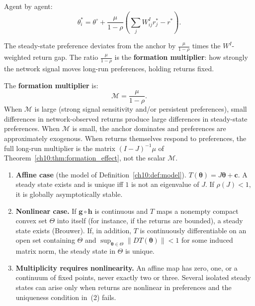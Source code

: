 \documentclass[../structural_economics_book.tex]{subfiles}
\begin{document}
Agent by agent:
\begin{equation}\label{ch10:eq:steady_i}
\theta_i^* = \theta^{\circ} + \frac{\mu}{1-\rho}\left(\sum_j W^I_{ij} r_j^* - r^*\right).
\end{equation}

The steady-state preference deviates from the anchor by $\frac{\mu}{1-\rho}$ times the $W^I$-weighted return gap. The ratio $\frac{\mu}{1-\rho}$ is the \textbf{formation multiplier}: how strongly the network signal moves long-run preferences, holding returns fixed.

\begin{definition}\label{ch10:def:multiplier}
The \textbf{formation multiplier} is:
\begin{equation}\label{ch10:eq:multiplier}
\mathcal{M} = \frac{\mu}{1-\rho}.
\end{equation}
When $\mathcal{M}$ is large (strong signal sensitivity and/or persistent preferences), small differences in network-observed returns produce large differences in steady-state preferences. When $\mathcal{M}$ is small, the anchor dominates and preferences are approximately exogenous. When returns themselves respond to preferences, the full long-run multiplier is the matrix $(I - J)^{-1}\mu$ of Theorem~\ref{ch10:thm:formation_effect}, not the scalar $\mathcal{M}$.
\end{definition}

\begin{theorem}\label{ch10:thm:existence}
\begin{enumerate}
\item \textbf{Affine case} (the model of Definition~\ref{ch10:def:model}). $T(\boldsymbol{\theta}) = J\boldsymbol{\theta} + \mathbf{c}$. A steady state exists and is unique iff $1$ is not an eigenvalue of $J$. If $\rho(J) < 1$, it is globally asymptotically stable.
\item \textbf{Nonlinear case.} If $\mathbf{g}\circ\mathbf{h}$ is continuous and $T$ maps a nonempty compact convex set $\Theta$ into itself (for instance, if the returns are bounded), a steady state exists (Brouwer). If, in addition, $T$ is continuously differentiable on an open set containing $\Theta$ and $\sup_{\boldsymbol{\theta}\in\Theta}\|DT(\boldsymbol{\theta})\| < 1$ for some induced matrix norm, the steady state in $\Theta$ is unique.
\item \textbf{Multiplicity requires nonlinearity.} An affine map has zero, one, or a continuum of fixed points, never exactly two or three. Several isolated steady states can arise only when returns are nonlinear in preferences and the uniqueness condition in~(2) fails.
\end{enumerate}
\end{theorem}
\end{document}
